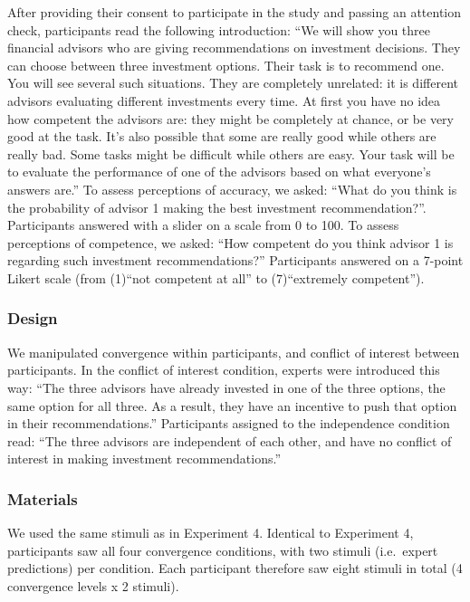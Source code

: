 \documentclass[
  doc,floatsintext]{apa6}
\begin{document}
After providing their consent to participate in the study and passing an attention check, participants read the following introduction: ``We will show you three financial advisors who are giving recommendations on investment decisions. They can choose between three investment options. Their task is to recommend one. You will see several such situations. They are completely unrelated: it is different advisors evaluating different investments every time. At first you have no idea how competent the advisors are: they might be completely at chance, or be very good at the task. It's also possible that some are really good while others are really bad. Some tasks might be difficult while others are easy. Your task will be to evaluate the performance of one of the advisors based on what everyone's answers are.'' To assess perceptions of accuracy, we asked: ``What do you think is the probability of advisor 1 making the best investment recommendation?''. Participants answered with a slider on a scale from 0 to 100. To assess perceptions of competence, we asked: ``How competent do you think advisor 1 is regarding such investment recommendations?'' Participants answered on a 7-point Likert scale (from (1)``not competent at all'' to (7)``extremely competent'').

\subsubsection{Design}\label{design-4}

We manipulated convergence within participants, and conflict of interest between participants. In the conflict of interest condition, experts were introduced this way: ``The three advisors have already invested in one of the three options, the same option for all three. As a result, they have an incentive to push that option in their recommendations.'' Participants assigned to the independence condition read: ``The three advisors are independent of each other, and have no conflict of interest in making investment recommendations.''

\subsubsection{Materials}\label{materials-4}

We used the same stimuli as in Experiment 4. Identical to Experiment 4, participants saw all four convergence conditions, with two stimuli (i.e.~expert predictions) per condition. Each participant therefore saw eight stimuli in total (4 convergence levels x 2 stimuli).
\end{document}
